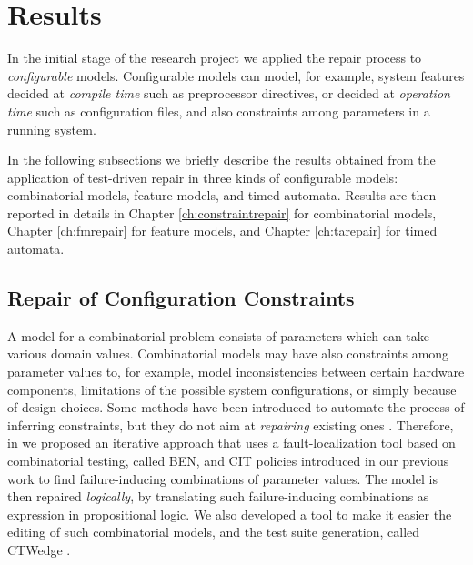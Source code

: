 \section{Results}\label{sec:researchresults}
In the initial stage of the research project we applied the repair process to \textit{configurable} models.
Configurable models can model, for example, system features decided at \textit{compile time} such as preprocessor directives, or decided at \textit{operation time} such as configuration files, and also constraints among parameters in a running system.

In the following subsections we briefly describe the results obtained from the application of test-driven repair in three kinds of configurable models: combinatorial models, feature models, and timed automata.
Results are then reported in details in Chapter \ref{ch:constraintrepair} for combinatorial models, Chapter \ref{ch:fmrepair} for feature models, and Chapter \ref{ch:tarepair} for timed automata.

\subsection{Repair of Configuration Constraints}\label{sec:constraintrepair}

A model for a combinatorial problem consists of parameters which can take various domain values. Combinatorial models may have also constraints among parameter values to, for example, model inconsistencies between certain hardware components, limitations of the possible system configurations, or simply because of design choices.
Some methods have been introduced to automate the process of inferring constraints, but they do not aim at \textit{repairing} existing ones \cite{Abukwaik_2016,Temple16:using}. 
Therefore, in \cite{gargantini_combinatorial_2017} %
we proposed an iterative approach that uses a fault-localization tool based on combinatorial testing, called BEN, and CIT policies introduced in our previous work \cite{Gargantini16:validation} to find failure-inducing combinations of parameter values.
The model is then repaired \textit{logically}, by translating such failure-inducing combinations as expression in propositional logic.
We also developed a tool to make it easier the editing of such combinatorial models, and the test suite generation, called CTWedge \cite{IWCTGargantini2018}.

